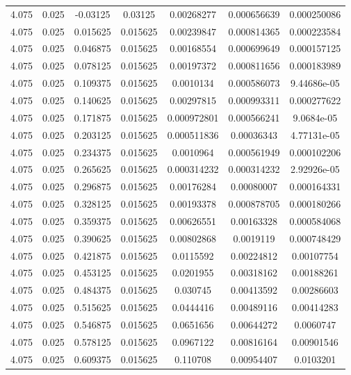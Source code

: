 \begin{table}[bh]
\begin{center}
{\begin{tabular}{ccccccc}
4.075	 & 0.025 & 	-0.03125	 & 0.03125	 & 0.00268277	 & 0.000656639	 & 0.000250086 \\ 
4.075	 & 0.025 & 	0.015625	 & 0.015625	 & 0.00239847	 & 0.000814365	 & 0.000223584 \\ 
4.075	 & 0.025 & 	0.046875	 & 0.015625	 & 0.00168554	 & 0.000699649	 & 0.000157125 \\ 
4.075	 & 0.025 & 	0.078125	 & 0.015625	 & 0.00197372	 & 0.000811656	 & 0.000183989 \\ 
4.075	 & 0.025 & 	0.109375	 & 0.015625	 & 0.0010134	 & 0.000586073	 & 9.44686e-05 \\ 
4.075	 & 0.025 & 	0.140625	 & 0.015625	 & 0.00297815	 & 0.000993311	 & 0.000277622 \\ 
4.075	 & 0.025 & 	0.171875	 & 0.015625	 & 0.000972801	 & 0.000566241	 & 9.0684e-05 \\ 
4.075	 & 0.025 & 	0.203125	 & 0.015625	 & 0.000511836	 & 0.00036343	 & 4.77131e-05 \\ 
4.075	 & 0.025 & 	0.234375	 & 0.015625	 & 0.0010964	 & 0.000561949	 & 0.000102206 \\ 
4.075	 & 0.025 & 	0.265625	 & 0.015625	 & 0.000314232	 & 0.000314232	 & 2.92926e-05 \\ 
4.075	 & 0.025 & 	0.296875	 & 0.015625	 & 0.00176284	 & 0.00080007	 & 0.000164331 \\ 
4.075	 & 0.025 & 	0.328125	 & 0.015625	 & 0.00193378	 & 0.000878705	 & 0.000180266 \\ 
4.075	 & 0.025 & 	0.359375	 & 0.015625	 & 0.00626551	 & 0.00163328	 & 0.000584068 \\ 
4.075	 & 0.025 & 	0.390625	 & 0.015625	 & 0.00802868	 & 0.0019119	 & 0.000748429 \\ 
4.075	 & 0.025 & 	0.421875	 & 0.015625	 & 0.0115592	 & 0.00224812	 & 0.00107754 \\ 
4.075	 & 0.025 & 	0.453125	 & 0.015625	 & 0.0201955	 & 0.00318162	 & 0.00188261 \\ 
4.075	 & 0.025 & 	0.484375	 & 0.015625	 & 0.030745	 & 0.00413592	 & 0.00286603 \\ 
4.075	 & 0.025 & 	0.515625	 & 0.015625	 & 0.0444416	 & 0.00489116	 & 0.00414283 \\ 
4.075	 & 0.025 & 	0.546875	 & 0.015625	 & 0.0651656	 & 0.00644272	 & 0.0060747 \\ 
4.075	 & 0.025 & 	0.578125	 & 0.015625	 & 0.0967122	 & 0.00816164	 & 0.00901546 \\ 
4.075	 & 0.025 & 	0.609375	 & 0.015625	 & 0.110708	 & 0.00954407	 & 0.0103201 \\ 

\end{tabular}}
\end{center}
\end{table}
